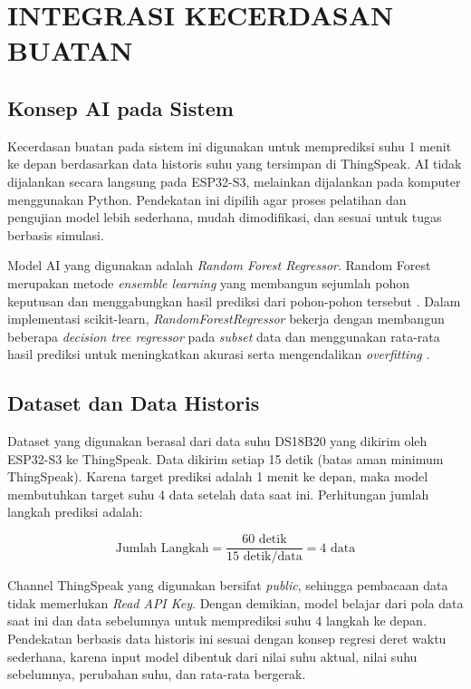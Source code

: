 \chapter{INTEGRASI KECERDASAN BUATAN}

\section{Konsep AI pada Sistem}

Kecerdasan buatan pada sistem ini digunakan untuk memprediksi suhu 1 menit
ke depan berdasarkan data historis suhu yang tersimpan di ThingSpeak. AI tidak
dijalankan secara langsung pada ESP32-S3, melainkan dijalankan pada komputer
menggunakan Python. Pendekatan ini dipilih agar proses pelatihan dan pengujian
model lebih sederhana, mudah dimodifikasi, dan sesuai untuk tugas berbasis
simulasi.

Model AI yang digunakan adalah \textit{Random Forest Regressor}. Random
Forest merupakan metode \textit{ensemble learning} yang membangun sejumlah
pohon keputusan dan menggabungkan hasil prediksi dari pohon-pohon tersebut
\cite{breiman2001}. Dalam implementasi scikit-learn, \textit{RandomForestRegressor}
bekerja dengan membangun beberapa \textit{decision tree regressor} pada
\textit{subset} data dan menggunakan rata-rata hasil prediksi untuk
meningkatkan akurasi serta mengendalikan \textit{overfitting}
\cite{sklearn_rf}.

\section{Dataset dan Data Historis}

Dataset yang digunakan berasal dari data suhu DS18B20 yang dikirim oleh
ESP32-S3 ke ThingSpeak. Data dikirim setiap 15 detik (batas aman minimum
ThingSpeak). Karena target prediksi adalah 1 menit ke depan, maka model
membutuhkan target suhu 4 data setelah data saat ini. Perhitungan jumlah
langkah prediksi adalah:

\begin{equation}
\text{Jumlah Langkah} = \frac{60 \text{ detik}}{15 \text{ detik/data}} = 4 \text{ data}
\label{eq:pred-steps}
\end{equation}

Channel ThingSpeak yang digunakan bersifat \textit{public}, sehingga
pembacaan data tidak memerlukan \textit{Read API Key}. Dengan demikian,
model belajar dari pola data saat ini dan data sebelumnya untuk memprediksi
suhu 4 langkah ke depan. Pendekatan berbasis data historis
ini sesuai dengan konsep regresi deret waktu sederhana, karena input model
dibentuk dari nilai suhu aktual, nilai suhu sebelumnya, perubahan suhu, dan
rata-rata bergerak.

